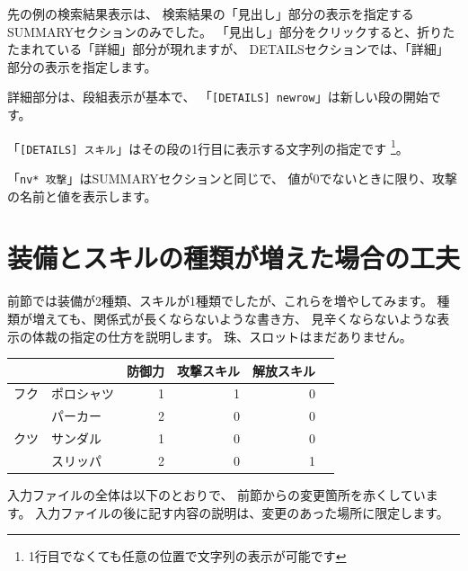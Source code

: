 \documentclass[dvipdfmx]{jsarticle}
\begin{document}
先の例の検索結果表示は、
検索結果の「見出し」部分の表示を指定するSUMMARYセクションのみでした。
「見出し」部分をクリックすると、折りたたまれている「詳細」部分が現れますが、
DETAILSセクションでは、「詳細」部分の表示を指定します。

詳細部分は、段組表示が基本で、
「\texttt{[DETAILS] newrow}」は新しい段の開始です。

「\texttt{[DETAILS] スキル}」はその段の1行目に表示する文字列の指定です%
\footnote{
1行目でなくても任意の位置で文字列の表示が可能です
}。

「\texttt{nv* 攻撃}」はSUMMARYセクションと同じで、
値が0でないときに限り、攻撃の名前と値を表示します。

\begin{center}
\end{center}

\section{装備とスキルの種類が増えた場合の工夫} %
前節では装備が2種類、スキルが1種類でしたが、これらを増やしてみます。
種類が増えても、関係式が長くならないような書き方、
見辛くならないような表示の体裁の指定の仕方を説明します。
%
珠、スロットはまだありません。
%
\begin{center}
\begin{tabular}{llrrrr}
\toprule
&& 防御力 & 攻撃スキル & 解放スキル\\
\midrule
フク
& ポロシャツ & 1 & 1 & 0\\
& パーカー   & 2 & 0 & 0\\
\midrule
クツ
& サンダル & 1 & 0 & 0\\
& スリッパ & 2 & 0 & 1\\
\bottomrule
\end{tabular}
\end{center}
%
入力ファイルの全体は以下のとおりで、
前節からの変更箇所を赤くしています。
入力ファイルの後に記す内容の説明は、変更のあった場所に限定します。
\medskip
\end{document}
